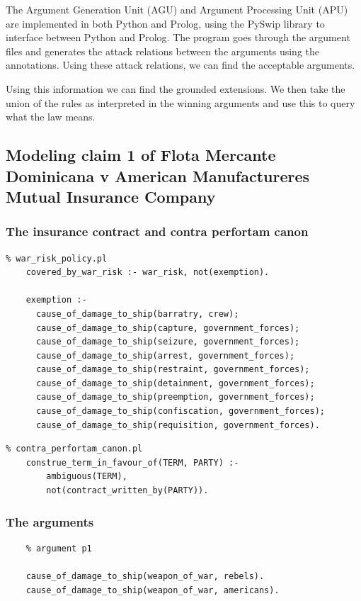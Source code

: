 The Argument Generation Unit (AGU) and Argument Processing Unit (APU) \cite{dung1995} are implemented in both Python and Prolog, using the PySwip library to interface between Python and Prolog. The program goes through the argument files and generates the attack relations between the arguments using the annotations. Using these attack relations, we can find the acceptable arguments. 

Using this information we can find the grounded extensions. We then take the union of the rules as interpreted in the winning arguments and use this to query what the law means.

\subsection{Modeling claim 1 of Flota Mercante Dominicana v American Manufactureres Mutual Insurance Company}

\subsubsection{The insurance contract and contra perfortam canon}

\begin{verbatim}
% war_risk_policy.pl
    covered_by_war_risk :- war_risk, not(exemption).
    
    exemption :-
      cause_of_damage_to_ship(barratry, crew);
      cause_of_damage_to_ship(capture, government_forces);
      cause_of_damage_to_ship(seizure, government_forces);
      cause_of_damage_to_ship(arrest, government_forces);
      cause_of_damage_to_ship(restraint, government_forces);
      cause_of_damage_to_ship(detainment, government_forces);
      cause_of_damage_to_ship(preemption, government_forces);
      cause_of_damage_to_ship(confiscation, government_forces);
      cause_of_damage_to_ship(requisition, government_forces).
\end{verbatim}

\begin{verbatim}
% contra_perfortam_canon.pl
    construe_term_in_favour_of(TERM, PARTY) :-
        ambiguous(TERM),
        not(contract_written_by(PARTY)).    
\end{verbatim}

\subsubsection{The arguments}

\begin{verbatim}
    % argument p1

    cause_of_damage_to_ship(weapon_of_war, rebels).
    cause_of_damage_to_ship(weapon_of_war, americans).
\end{verbatim}
    
